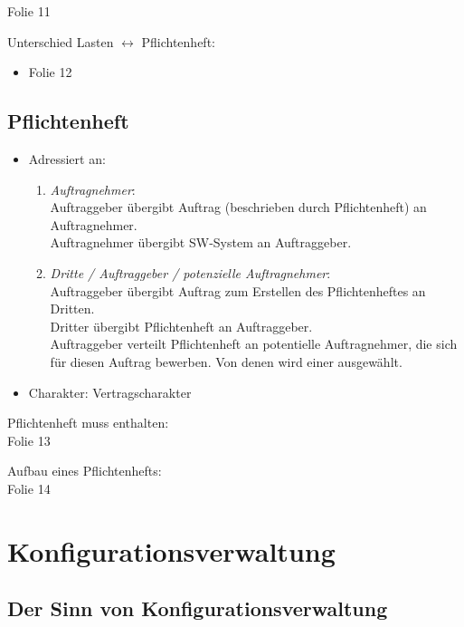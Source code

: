 Folie 11

Unterschied Lasten $\leftrightarrow$ Pflichtenheft:
\begin{itemize}
\item Folie 12
\end{itemize}

\section{Pflichtenheft}

\begin{itemize}
\item Adressiert an:
\begin{enumerate}
\item \emph{Auftragnehmer}:\\
Auftraggeber übergibt Auftrag (beschrieben durch Pflichtenheft) an Auftragnehmer.\\
Auftragnehmer übergibt SW-System an Auftraggeber.
\item \emph{Dritte / Auftraggeber / potenzielle Auftragnehmer}:\\
Auftraggeber übergibt Auftrag zum Erstellen des Pflichtenheftes an Dritten.\\
Dritter übergibt Pflichtenheft an Auftraggeber.\\
Auftraggeber verteilt Pflichtenheft an potentielle Auftragnehmer, die sich für diesen Auftrag bewerben. Von denen wird einer ausgewählt.
\end{enumerate}
\item Charakter: 
Vertragscharakter
\end{itemize}

Pflichtenheft muss enthalten:\\
Folie 13

Aufbau eines Pflichtenhefts:\\
Folie 14












\chapter{Konfigurationsverwaltung}
\section{Der Sinn von Konfigurationsverwaltung}


